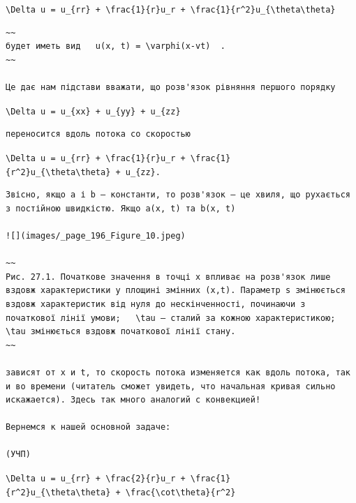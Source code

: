 \documentclass[
  ukrainian,
]{article}
\begin{document}
\texttt{\textbackslash{}Delta\ u\ =\ u\_\{rr\}\ +\ \textbackslash{}frac\{1\}\{r\}u\_r\ +\ \textbackslash{}frac\{1\}\{r\^{}2\}u\_\{\textbackslash{}theta\textbackslash{}theta\}}

\begin{verbatim}
~~
будет иметь вид   u(x, t) = \varphi(x-vt)  .
~~

Це дає нам підстави вважати, що розв'язок рівняння першого порядку
\end{verbatim}

\texttt{\textbackslash{}Delta\ u\ =\ u\_\{xx\}\ +\ u\_\{yy\}\ +\ u\_\{zz\}}

\begin{verbatim}
переносится вдоль потока со скоростью
\end{verbatim}

\texttt{\textbackslash{}Delta\ u\ =\ u\_\{rr\}\ +\ \textbackslash{}frac\{1\}\{r\}u\_r\ +\ \textbackslash{}frac\{1\}\{r\^{}2\}u\_\{\textbackslash{}theta\textbackslash{}theta\}\ +\ u\_\{zz\}.}

\begin{verbatim}
Звісно, якщо a і b — константи, то розв'язок — це хвиля, що рухається з постійною швидкістю. Якщо a(x, t) та b(x, t)

![](images/_page_196_Figure_10.jpeg)

~~
Рис. 27.1. Початкове значення в точці x впливає на розв'язок лише вздовж характеристики у площині змінних (x,t). Параметр s змінюється вздовж характеристик від нуля до нескінченності, починаючи з початкової лінії умови;   \tau — сталий за кожною характеристикою;   \tau змінюється вздовж початкової лінії стану.
~~

зависят от x и t, то скорость потока изменяется как вдоль потока, так и во времени (читатель сможет увидеть, что начальная кривая сильно искажается). Здесь так много аналогий с конвекцией!

Вернемся к нашей основной задаче:

(УЧП)
\end{verbatim}

\texttt{\textbackslash{}Delta\ u\ =\ u\_\{rr\}\ +\ \textbackslash{}frac\{2\}\{r\}u\_r\ +\ \textbackslash{}frac\{1\}\{r\^{}2\}u\_\{\textbackslash{}theta\textbackslash{}theta\}\ +\ \textbackslash{}frac\{\textbackslash{}cot\textbackslash{}theta\}\{r\^{}2\}}
\end{document}
